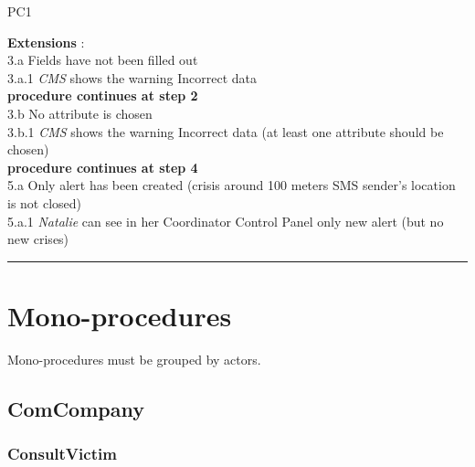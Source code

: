 \begin{lyxlist}{PC1}
{\item [\textbf{Extensions}]:\\
3.a Fields have not been filled out\\
	\hspace*{0.5cm} 3.a.1 \emph{CMS} shows the warning Incorrect data\\
	\hspace*{0.5cm} \textbf{procedure continues at step 2}\\
3.b No attribute is chosen\\
	\hspace*{0.5cm} 3.b.1 \emph{CMS} shows the warning Incorrect data 
	(at least one attribute should be chosen)\\
	\hspace*{0.5cm} \textbf{procedure continues at step 4}\\
5.a Only alert has been created (crisis around 100 meters SMS sender's location
is not closed)\\
	\hspace*{0.5cm} 5.a.1 \emph{Natalie} can see in her Coordinator Control Panel
	only new alert (but no new crises)\\
}
\end{lyxlist}
\hrule
\vspace{0.5cm}


\section{Mono-procedures}
Mono-procedures must be grouped by actors.

\subsection{ComCompany}

\subsubsection{ConsultVictim}

